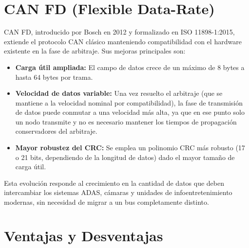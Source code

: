 \documentclass[pdflatex,sn-mathphys-num]{sn-jnl}%
\begin{document}
\section{CAN FD (Flexible Data-Rate)}\label{sec:canfd}
CAN FD, introducido por Bosch en 2012 y formalizado en ISO 11898-1:2015, extiende el protocolo CAN clásico manteniendo compatibilidad con el hardware existente en la fase de arbitraje. Sus mejoras principales son:

\begin{itemize}
    \item \textbf{Carga útil ampliada:} El campo de datos crece de un máximo de 8 bytes a hasta 64 bytes por trama.
    \item \textbf{Velocidad de datos variable:} Una vez resuelto el arbitraje (que se mantiene a la velocidad nominal por compatibilidad), la fase de transmisión de datos puede conmutar a una velocidad más alta, ya que en ese punto solo un nodo transmite y no es necesario mantener los tiempos de propagación conservadores del arbitraje.
    \item \textbf{Mayor robustez del CRC:} Se emplea un polinomio CRC más robusto (17 o 21 bits, dependiendo de la longitud de datos) dado el mayor tamaño de carga útil.
\end{itemize}

Esta evolución responde al crecimiento en la cantidad de datos que deben intercambiar los sistemas ADAS, cámaras y unidades de infoentretenimiento modernas, sin necesidad de migrar a un bus completamente distinto.

\section{Ventajas y Desventajas}\label{sec:proscons}
\end{document}

